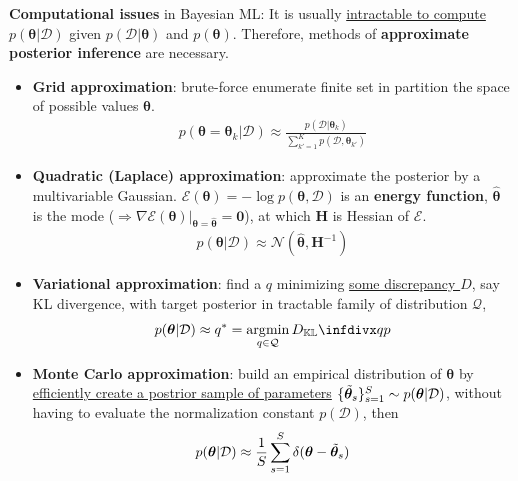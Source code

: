 \textbf{Computational issues} in Bayesian ML: 
It is usually \uline{intractable to compute $p(\bm{\theta}|\mathcal{D})$}
given $p(\mathcal{D}|\bm{\theta})$ and $p(\bm{\theta})$.
Therefore, methods of \textbf{approximate posterior inference} are necessary.
\begin{itemize}
    \item \textbf{Grid approximation}:  
    brute-force enumerate finite set in partition the space of possible values $\bm{\theta}$.
    \begin{gather}
        p(\bm{\theta}=\bm{\theta}_k|\mathcal{D})
        \approx \frac{p(\mathcal{D}|\bm{\theta}_k)}{\sum_{k'=1}^K{p(\mathcal{D},\bm{\theta}_{k'})}}
    \end{gather}
    \item \textbf{Quadratic (Laplace) approximation}: 
    approximate the posterior by a multivariable Gaussian.
    $\mathcal{E}(\bm{\theta})=-\log{p(\bm{\theta},\mathcal{D})}$ is an \textbf{energy function}, 
    $\hat{\bm{\theta}}$ is the mode ($\Rightarrow\nabla{\mathcal{E}(\bm{\theta})}|_{\bm{\theta}=\hat{\bm{\theta}}}=\bm{0}$), 
    at which $\mathbf{H}$ is Hessian of $\mathcal{E}$.
    \begin{gather}
        p(\bm{\theta}|\mathcal{D})
        \approx \mathcal{N}(\hat{\bm{\theta}},\mathbf{H}^{-1})
    \end{gather}
    \item \textbf{Variational approximation}: 
    find a $q$ minimizing \uline{some discrepancy $D$}, say KL divergence, with target posterior
    in tractable family of distribution $\mathcal{Q}$,
    \begin{gather}
        p(\bm{\theta}|\mathcal{D})
        \approx q^*=\argmin_{q\in\mathcal{Q}} \infdiv{q}{p}
    \end{gather}
    \item \textbf{Monte Carlo approximation}: 
    build an empirical distribution of $\bm{\theta}$ by
    \uline{efficiently create a postrior sample of parameters} $\{\Tilde{\bm{\theta}}_s\}_{s=1}^S\sim p(\bm{\theta}|\mathcal{D})$, 
    without having to evaluate the normalization constant $p(\mathcal{D})$, then
    \begin{gather}
        p(\bm{\theta}|\mathcal{D})
        \approx\frac{1}{S}\sum_{s=1}^S\delta(\bm{\theta}-\Tilde{\bm{\theta}}_s)
    \end{gather}
\end{itemize}

